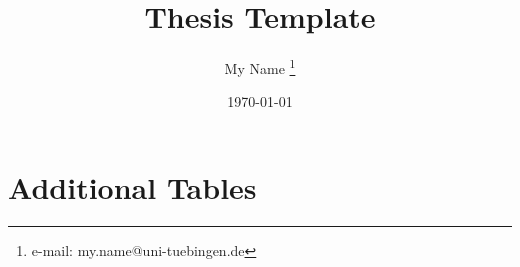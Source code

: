 \documentclass[a4paper]{article}
\title{Thesis Template}
\author{My Name \thanks{e-mail: my.name@uni-tuebingen.de}}
\date{\today}
\begin{document}


\tableofcontents




\appendix
\section{Additional Tables}

\newpage 

\printbibliography
\end{document}
